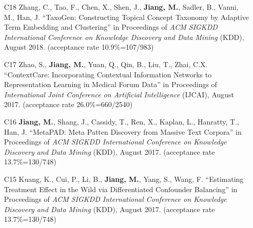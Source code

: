 \documentclass[10pt]{article}
\newenvironment{myindentpar}[1]%
{\begin{list}{}%
         {\setlength{\leftmargin}{#1}}%
         \item[]%
}
{\end{list}}
\newcounter{list}
\newcommand{\hide}[1]{}
\begin{document}
\begin{myindentpar}{0.00cm}
\begin{enumerate}[leftmargin=.5cm]
	\hide{\vspace{-0.1cm}\hspace{0.5cm}{\small \emph{I made 40\% contribution and Dr. Li made 40\%. Dr. Li and I are co-first authors. I conceived the idea. Dr. Li did the experiments, and wrote the paper.}}}

\item[C18] Zhang, C., Tao, F., Chen, X., Shen, J., \textbf{Jiang, M.}, Sadler, B., Vanni, M., Han, J. ``TaxoGen: Constructing Topical Concept Taxonomy by Adaptive Term Embedding and Clustering'' in Proceedings of \emph{ACM SIGKDD International Conference on Knowledge Discovery and Data Mining} (KDD), August 2018. (acceptance rate 10.9\%=107/983)

	\hide{\vspace{-0.1cm}\hspace{0.5cm}{\small \emph{I made 3\% contribution. Mr. Zhang conceived the idea in consultation with myself. Mr. Zhang did the experiments and wrote the paper.}}}

\item[C17] Zhao, S., \textbf{Jiang, M.}, Yuan, Q., Qin, B., Liu, T., Zhai, C.X. ``ContextCare: Incorporating Contextual Information Networks to Representation Learning in Medical Forum Data'' in Proceedings of \emph{International Joint Conference on Artificial Intelligence} (IJCAI), August 2017. (acceptance rate 26.0\%=660/2540)

	\hide{\vspace{-0.1cm}\hspace{0.5cm}{\small \emph{I made 30\% contribution and Mr. Zhao made 60\%. Mr. Zhao conceived the idea in consultation with myself. Mr. Zhao implemented the system and completed the experiments. I wrote the introduction section. Mr. Zhao wrote the rest of the paper.}}}

\item[C16] \textbf{Jiang, M.}, Shang, J., Cassidy, T., Ren, X., Kaplan, L., Hanratty, T., Han, J. ``MetaPAD: Meta Patten Discovery from Massive Text Corpora'' in Proceedings of \emph{ACM SIGKDD International Conference on Knowledge Discovery and Data Mining} (KDD), August 2017. (acceptance rate 13.7\%=130/748)

	\hide{\vspace{-0.1cm}\hspace{0.5cm}{\small \emph{I conceived the idea, designed the study, did the experiments, and wrote the paper. Dr. Han edited the paper.}}}

\item[C15] Kuang, K., Cui, P., Li, B., \textbf{Jiang, M.}, Yang, S., Wang, F. ``Estimating Treatment Effect in the Wild via Differentiated Confounder Balancing'' in Proceedings of \emph{ACM SIGKDD International Conference on Knowledge Discovery and Data Mining} (KDD), August 2017. (acceptance rate 13.7\%=130/748)


\end{enumerate}
\end{myindentpar}
\end{document}
